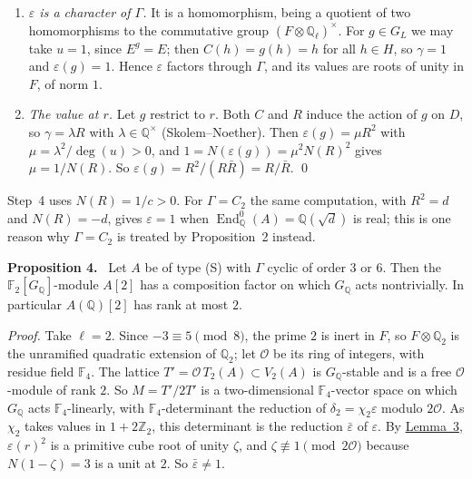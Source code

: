 \documentclass[11pt]{article}
\newenvironment{statement}[1]{\par\medskip\noindent\phantomsection\textbf{#1}\ }{\par\medskip}
\newcommand{\Q}{\mathbb Q}
\newcommand{\Z}{\mathbb Z}
\newcommand{\F}{\mathbb F}
\DeclareMathOperator{\End}{End}
\begin{document}
\begin{enumerate}
\item \emph{\(\varepsilon\) is a character of \(\Gamma\).} It is a homomorphism, being a quotient of
two homomorphisms to the commutative group \((F\otimes\Q_\ell)^\times\). For \(g\in G_L\) we may
take \(u=1\), since \(E^g=E\); then \(C(h)=g(h)=h\) for all \(h\in H\), so \(\gamma=1\) and
\(\varepsilon(g)=1\). Hence \(\varepsilon\) factors through \(\Gamma\), and its values are roots of
unity in \(F\), of norm \(1\).

\item \emph{The value at \(r\).} Let \(g\) restrict to \(r\). Both \(C\) and \(R\) induce the
action of \(g\) on \(D\), so \(\gamma=\lambda R\) with \(\lambda\in\Q^\times\) (Skolem--Noether). Then
\(\varepsilon(g)=\mu R^2\) with \(\mu=\lambda^2/\deg(u)>0\), and
\(1=N(\varepsilon(g))=\mu^2N(R)^2\) gives \(\mu=1/N(R)\). So
\(\varepsilon(g)=R^2/(R\bar R)=R/\bar R\). \qed
\end{enumerate}

Step~4 uses \(N(R)=1/c>0\). For \(\Gamma=C_2\) the same computation, with \(R^2=d\) and
\(N(R)=-d\), gives \(\varepsilon=1\) when \(\End^0_{\Q}(A)=\Q(\sqrt d)\) is real; this is one
reason why \(\Gamma=C_2\) is treated by Proposition~2 instead.

\begin{statement}{Proposition 4.}\label{prop-cyclic}
Let \(A\) be of type (S) with \(\Gamma\) cyclic of order \(3\) or \(6\). Then the
\(\F_2[G_{\Q}]\)-module \(A[2]\) has a composition factor on which \(G_{\Q}\) acts nontrivially.
In particular \(A(\Q)[2]\) has rank at most \(2\).
\end{statement}

\emph{Proof.} Take \(\ell=2\). Since \(-3\equiv5\pmod8\), the prime \(2\) is inert in \(F\), so
\(F\otimes\Q_2\) is the unramified quadratic extension of \(\Q_2\); let \(\mathcal O\) be its ring
of integers, with residue field \(\F_4\). The lattice \(T'=\mathcal O\,T_2(A)\subset V_2(A)\) is
\(G_{\Q}\)-stable and is a free \(\mathcal O\)-module of rank \(2\). So \(M=T'/2T'\) is a
two-dimensional \(\F_4\)-vector space on which \(G_{\Q}\) acts \(\F_4\)-linearly, with
\(\F_4\)-determinant the reduction of \(\delta_2=\chi_2\varepsilon\) modulo \(2\mathcal O\). As
\(\chi_2\) takes values in \(1+2\Z_2\), this determinant is the reduction \(\bar\varepsilon\) of
\(\varepsilon\). By \hyperref[lemma-det]{Lemma~3}, \(\varepsilon(r)^2\) is a primitive cube root of
unity \(\zeta\), and \(\zeta\not\equiv1\pmod{2\mathcal O}\) because \(N(1-\zeta)=3\) is a unit at
\(2\). So \(\bar\varepsilon\neq1\).
\end{document}
